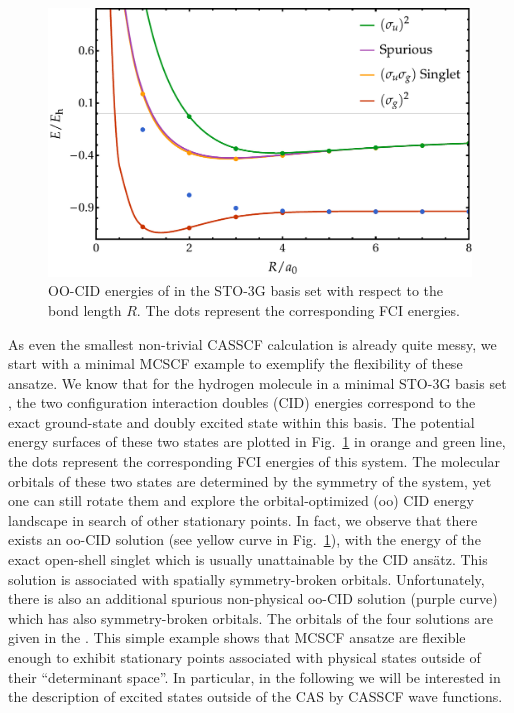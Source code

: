 \documentclass[aps,prb,reprint,showkeys,superscriptaddress]{revtex4-1}
\begin{document}
\begin{figure}
  \centering
  \includegraphics[width=\linewidth]{Figures/fig_1.pdf}
  \caption{
    OO-CID energies of  in the STO-3G basis set with respect to the bond length $R$. The dots represent the corresponding FCI energies.
    \label{fig:fig_1}}
\end{figure}

As even the smallest non-trivial CASSCF calculation is already quite messy, we start with a minimal MCSCF example to exemplify the flexibility of these ansatze.
We know that for the hydrogen molecule in a minimal STO-3G basis set \cite{Hehre_1969}, the two configuration interaction doubles (CID) energies correspond to the exact ground-state and doubly excited state within this basis.
The potential energy surfaces of these two states are plotted in Fig.~\ref{fig:fig_1} in orange and green line, the dots represent the corresponding FCI energies of this system.
The molecular orbitals of these two states are determined by the symmetry of the system, yet one can still rotate them and explore the orbital-optimized (oo) CID energy landscape in search of other stationary points.
In fact, we observe that there exists an oo-CID solution (see yellow curve in Fig.~\ref{fig:fig_1}), with the energy of the exact open-shell singlet which is usually unattainable by the CID ansätz.
This solution is associated with spatially symmetry-broken orbitals.
Unfortunately, there is also an additional spurious non-physical oo-CID solution (purple curve) which has also symmetry-broken orbitals.
The orbitals of the four solutions are given in the \SupInf.
This simple example shows that MCSCF ansatze are flexible enough to exhibit stationary points associated with physical states outside of their ``determinant space''.
In particular, in the following we will be interested in the description of excited states outside of the CAS by CASSCF wave functions.
\end{document}
